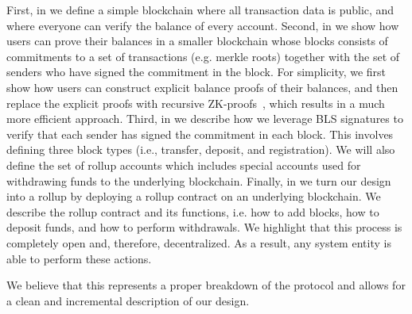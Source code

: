 \smallbreak
First, in  we define a simple blockchain where all transaction data is public, and where everyone can verify the balance of every account.
\smallbreak
Second, in  we show how users can prove their balances in a smaller blockchain whose blocks consists of commitments to a set of transactions (e.g. merkle roots) together with the set of senders who have signed the commitment in the block. For simplicity, we first show how users can construct explicit balance proofs of their balances, and then replace the explicit proofs with recursive ZK-proofs~\cite{supernova,nova,plonky2}, which results in a much more efficient approach.
\smallbreak
Third, in  we describe how we leverage BLS signatures to verify that each sender has signed the commitment in each block. This involves defining three block types (i.e., transfer, deposit, and registration). We will also define the set of rollup accounts which includes special accounts used for withdrawing funds to the underlying blockchain.
\smallbreak
Finally, in  we turn our design into a rollup by deploying a rollup contract on an underlying blockchain. We describe the rollup contract and its functions, i.e. how to add blocks, how to deposit funds, and how to perform withdrawals. We highlight that this process is completely open and, therefore, decentralized. As a result, any system entity is able to perform these actions.

\smallbreak

We believe that this represents a proper breakdown of the protocol and allows for a clean and incremental description of our design.